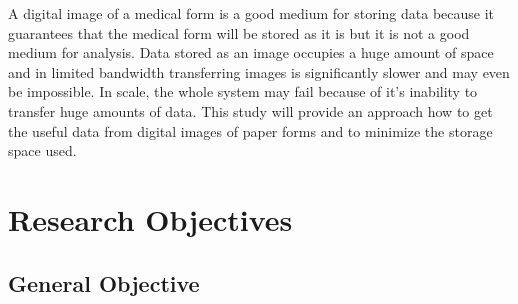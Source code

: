 A digital image of a medical form is a good medium for storing data because it guarantees that the medical form will be stored as it is but it is not a good medium for analysis.  Data stored as an image occupies a huge amount of space and in limited bandwidth transferring images is significantly slower and may even be impossible. In scale, the whole system may fail because of it’s inability to transfer huge amounts of data.  This study will provide an approach how to get the useful data from digital images of paper forms and to minimize the storage space used. 

\begin{comment}
\figref{fig:disneystock} shows a graph of the performance of Disney stock from the 1980s to 2012.
  
\begin{comment}[t]                %
   \centering                    %
   \texttt{[image: DisneyChart.png]}      %
   \caption{This is the figure's caption -- Disney stock chart}
    \label{fig:disneystock}
\end{comment}


\begin{comment}
 \item \citeA{kartch:2000:ERA} compared reaction times...
 \item In a recent study of reaction times \cite{kartch:2000:ERA}...
 \item In \citeyearNP{kartch:2000:ERA}, \citeauthor{kartch:2000:ERA} compared reaction times...
 \item \shortciteA{fedkiw:2001:VSO} compared reaction times... 
 \item In a recent study of reaction times \cite{fedkiw:2001:VSO}...
 \item In \citeyearNP{fedkiw:2001:VSO}, \shortciteauthor{fedkiw:2001:VSO}, compared reaction times...
\end{comment}



\section{Research Objectives}
\label{sec:researchobjectives}

\subsection{General Objective}
\label{sec:generalobjective}

